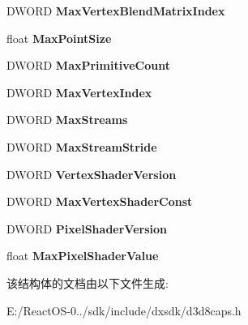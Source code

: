 \begin{DoxyCompactItemize}
\item 
\mbox{\label{struct___d3_d_c_a_p_s8_af513fcfb22ca54db880b25c1aeaf56e7}} 
D\+W\+O\+RD {\bfseries Max\+Vertex\+Blend\+Matrix\+Index}
\item 
\mbox{\label{struct___d3_d_c_a_p_s8_a7359aa054e5576742342aa8f96434e74}} 
float {\bfseries Max\+Point\+Size}
\item 
\mbox{\label{struct___d3_d_c_a_p_s8_a1a03cd974aa1e1feab839369dd680729}} 
D\+W\+O\+RD {\bfseries Max\+Primitive\+Count}
\item 
\mbox{\label{struct___d3_d_c_a_p_s8_a024a30a9db2b7a8f8d48d1b07e91c64d}} 
D\+W\+O\+RD {\bfseries Max\+Vertex\+Index}
\item 
\mbox{\label{struct___d3_d_c_a_p_s8_a69f3e7928db3e9f82c2d0c751b6ed37b}} 
D\+W\+O\+RD {\bfseries Max\+Streams}
\item 
\mbox{\label{struct___d3_d_c_a_p_s8_acd27687be2538ae01a8761f9c98af6ee}} 
D\+W\+O\+RD {\bfseries Max\+Stream\+Stride}
\item 
\mbox{\label{struct___d3_d_c_a_p_s8_a8a120af8c3c49b72ac1ec1986435305b}} 
D\+W\+O\+RD {\bfseries Vertex\+Shader\+Version}
\item 
\mbox{\label{struct___d3_d_c_a_p_s8_a7f9ee5b351ca62706d20432256cd5fb2}} 
D\+W\+O\+RD {\bfseries Max\+Vertex\+Shader\+Const}
\item 
\mbox{\label{struct___d3_d_c_a_p_s8_a08c08d933fe24ae6d2e1fcf31a8e4510}} 
D\+W\+O\+RD {\bfseries Pixel\+Shader\+Version}
\item 
\mbox{\label{struct___d3_d_c_a_p_s8_ae0d2aaf6b2644b72d1001ad3fe3ee360}} 
float {\bfseries Max\+Pixel\+Shader\+Value}
\end{DoxyCompactItemize}


该结构体的文档由以下文件生成\+:\begin{DoxyCompactItemize}
\item 
E\+:/\+React\+O\+S-\/0../sdk/include/dxsdk/d3d8caps.\+h\end{DoxyCompactItemize}
